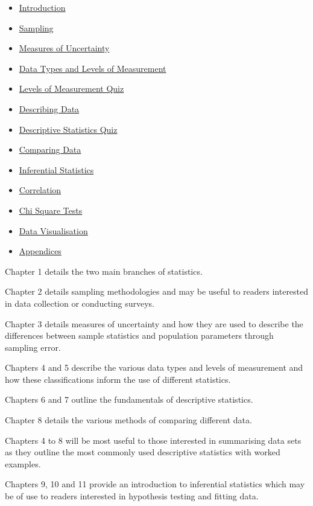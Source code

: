 \documentclass[
]{book}
\providecommand{\tightlist}{%
  \setlength{\itemsep}{0pt}\setlength{\parskip}{0pt}}
\begin{document}
\begin{itemize}
\tightlist
\item
  \protect\hyperlink{intro}{Introduction}
\item
  \protect\hyperlink{sampling}{Sampling}
\item
  \protect\hyperlink{error}{Measures of Uncertainty}
\item
  \protect\hyperlink{datatypes}{Data Types and Levels of Measurement}
\item
  \protect\hyperlink{quizone}{Levels of Measurement Quiz}
\item
  \protect\hyperlink{descdata}{Describing Data}
\item
  \protect\hyperlink{quiztwo}{Descriptive Statistics Quiz}
\item
  \protect\hyperlink{compdat}{Comparing Data}
\item
  \protect\hyperlink{infstat}{Inferential Statistics}
\item
  \protect\hyperlink{correlationchapter}{Correlation}
\item
  \protect\hyperlink{chisq}{Chi Square Tests}
\item
  \protect\hyperlink{datvis}{Data Visualisation}
\item
  \protect\hyperlink{appendices}{Appendices}
\end{itemize}

Chapter 1 details the two main branches of statistics.

Chapter 2 details sampling methodologies and may be useful to readers interested in data collection or conducting surveys.

Chapter 3 details measures of uncertainty and how they are used to describe the differences between sample statistics and population parameters through sampling error.

Chapters 4 and 5 describe the various data types and levels of measurement and how these classifications inform the use of different statistics.

Chapters 6 and 7 outline the fundamentals of descriptive statistics.

Chapter 8 details the various methods of comparing different data.

Chapters 4 to 8 will be most useful to those interested in summarising data sets as they outline the most commonly used descriptive statistics with worked examples.

Chapters 9, 10 and 11 provide an introduction to inferential statistics which may be of use to readers interested in hypothesis testing and fitting data.
\end{document}
